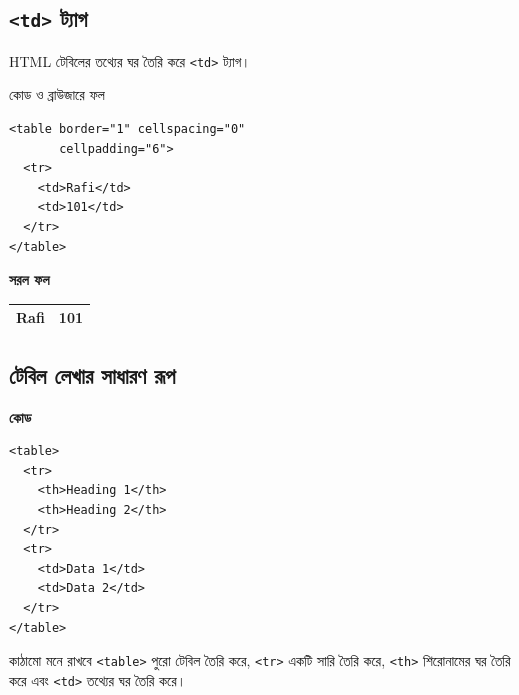 \subsection{\texttt{<td>} ট্যাগ}

\begin{definitionbox}{}
HTML টেবিলের তথ্যের ঘর তৈরি করে \texttt{<td>} ট্যাগ।
\end{definitionbox}

\begin{chFourWholeExample}{কোড ও ব্রাউজারে ফল}
\noindent
\begin{minipage}[t]{.50\linewidth}\vspace{0pt}
\begin{verbatim}
<table border="1" cellspacing="0"
       cellpadding="6">
  <tr>
    <td>Rafi</td>
    <td>101</td>
  </tr>
</table>
\end{verbatim}
\end{minipage}\hfill
\begin{minipage}[t]{.46\linewidth}\vspace{0pt}
\textbf{সরল ফল}\par
\begin{tabular}{|l|l|}\hline
Rafi & 101 \\\hline
\end{tabular}
\end{minipage}
\end{chFourWholeExample}

\subsection{টেবিল লেখার সাধারণ রূপ}

\par\noindent
\begin{minipage}[t]{.54\linewidth}\vspace{0pt}\small
\textbf{\color{chFourTeal}কোড}\par
\begin{verbatim}
<table>
  <tr>
    <th>Heading 1</th>
    <th>Heading 2</th>
  </tr>
  <tr>
    <td>Data 1</td>
    <td>Data 2</td>
  </tr>
</table>
\end{verbatim}
\par\smallskip
\end{minipage}\hfill
\begin{minipage}[t]{.42\linewidth}\vspace{0pt}\small
\begin{keypointbox}{কাঠামো মনে রাখবে}
\texttt{<table>} পুরো টেবিল তৈরি করে, \texttt{<tr>} একটি সারি তৈরি করে, \texttt{<th>} শিরোনামের ঘর তৈরি করে এবং \texttt{<td>} তথ্যের ঘর তৈরি করে।
\end{keypointbox}
\end{minipage}\par


